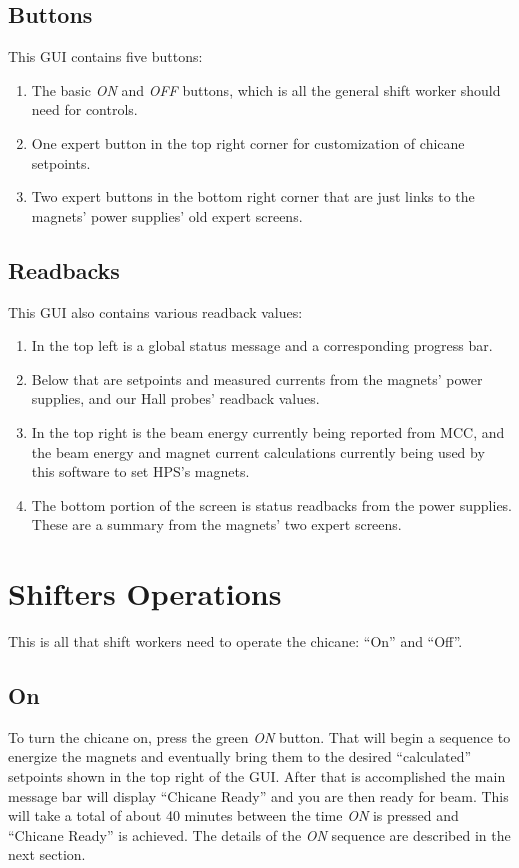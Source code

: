 \documentclass[amsmath,amssymb,notitlepage,12pt]{revtex4-1}
\begin{document}
\subsection{Buttons}
This GUI contains five buttons:
\begin{enumerate}
    \item The basic {\em ON} and {\em OFF} buttons, which is all the general shift worker should need for controls.
    \item One expert button in the top right corner for customization of chicane setpoints.
    \item Two expert buttons in the bottom right corner that are just links to the magnets' power supplies' old expert screens.
\end{enumerate}
\subsection{Readbacks}
This GUI also contains various readback values:
\begin{enumerate}
    \item In the top left is a global status message and a corresponding progress bar.
    \item Below that are setpoints and measured currents from the magnets' power supplies, and our Hall probes' readback values.
    \item In the top right is the beam energy currently being reported from MCC, and the beam energy and magnet current calculations currently being used by this software to set HPS's magnets.
    \item The bottom portion of the screen is status readbacks from the power supplies.  These are a summary from the magnets' two expert screens.
\end{enumerate}

\section{Shifters Operations}
This is all that shift workers need to operate the chicane:  ``On'' and ``Off''.
\subsection{On}
To turn the chicane on, press the green {\em ON} button.  That will begin a sequence to energize the magnets and eventually bring them to the desired ``calculated'' setpoints shown in the top right of the GUI.  After that is accomplished the main message bar will display ``Chicane Ready'' and you are then ready for beam.  This will take a total of about 40 minutes between the time {\em ON} is pressed and ``Chicane Ready'' is achieved.  The details of the {\em ON} sequence are described in the next section.
\end{document}
